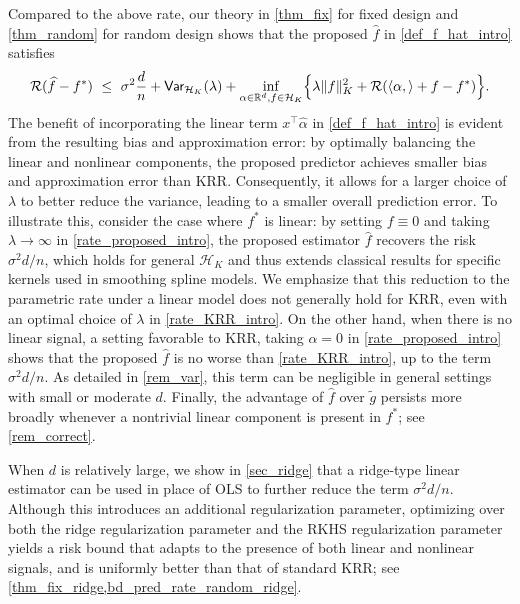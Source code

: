 \documentclass[11pt,twoside]{article}
\def\RR{\mathbb{R}}
\def\cH{\mathcal H}
\def\cR{\mathcal R}
\def\wh{\widehat}
\def\wt{\widetilde}
\def\T{\top}
\begin{document}
Compared to the above rate, our theory in \cref{thm_fix} for fixed design and \cref{thm_random} for random design shows that the proposed $\wh f$ in \eqref{def_f_hat_intro} satisfies
\begin{equation}\label{rate_proposed_intro}
   \cR(\wh f-f^*)  ~ \le ~ \sigma^2 {d\over n} + \textsf{Var}_{\cH_K}(\lambda) + \inf_{\alpha\in\RR^d, f\in \cH_K}\Bigl\{\lambda \|f\|_K^2  + \cR(\langle \alpha,\rangle + f-f^*)
    \Bigr\} .
\end{equation}
The benefit of incorporating the linear term $x^\T \wh \alpha$ in \eqref{def_f_hat_intro} is evident from the resulting bias and approximation error: by optimally balancing the linear and nonlinear components, the proposed predictor achieves smaller bias and approximation error than KRR. Consequently, it allows for a larger choice of $\lambda$ to better reduce the variance, leading to a smaller overall prediction error. To illustrate this, consider the case where $f^*$ is linear: by setting $f\equiv 0$ and taking $\lambda \to \infty$ in \eqref{rate_proposed_intro}, the proposed estimator $\wh f$ recovers the risk $\sigma^2 d/n$, which holds for general $\cH_K$ and thus extends classical results for specific kernels used in smoothing spline models. We emphasize that this reduction to the parametric rate under a linear model does not generally hold for KRR, even with an optimal choice of $\lambda$ in \eqref{rate_KRR_intro}. On the other hand, when there is no linear signal, a setting favorable to KRR, taking $\alpha = 0$ in \eqref{rate_proposed_intro} shows that the proposed $\wh f$ is no worse than \eqref{rate_KRR_intro}, up to the term $\sigma^2 d/n$. As detailed in \cref{rem_var}, this term can be negligible in general settings with small or moderate $d$. Finally, the advantage of $\wh f$ over $\wt g$ persists more broadly whenever a nontrivial linear component is present in $f^*$; see \cref{rem_correct}.

When $d$ is relatively large, we show in \cref{sec_ridge} that a ridge-type linear estimator can be used in place of OLS to further reduce the term $\sigma^2 d/n$. Although this introduces an additional regularization parameter, optimizing over both the ridge regularization parameter and the RKHS regularization parameter yields a risk bound that adapts to the presence of both linear and nonlinear signals, and is uniformly better than that of standard KRR; see \cref{thm_fix_ridge,bd_pred_rate_random_ridge}.
\\
\end{document}
